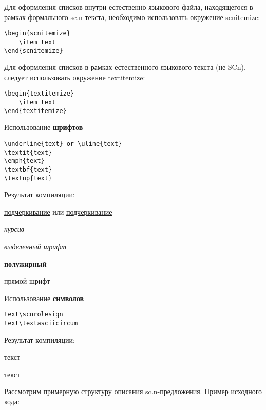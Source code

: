Для оформления списков внутри естественно-языкового файла, находящегося в рамках формального sc.n-текста, необходимо использовать окружение scnitemize:
\begin{lstlisting}              
\begin{scnitemize}
	\item text
\end{scnitemize}
\end{lstlisting}  

Для оформления списков в рамках естественного-языкового текста (не SCn), следует использовать окружение textitemize:
\begin{lstlisting}              
\begin{textitemize}
	\item text
\end{textitemize}
\end{lstlisting}  

Использование \textbf{шрифтов}

\begin{lstlisting}
\underline{text} or \uline{text}
\textit{text}
\emph{text}
\textbf{text}
\textup{text}
\end{lstlisting}

Результат компиляции:

\underline{подчеркивание} или \uline{подчер\-кивание}

\textit{курсив}

\emph{выделенный шрифт}

\textbf{полужирный}

\textup{прямой шрифт}

Использование \textbf{символов}

\begin{lstlisting}
text\scnrolesign
text\textasciicircum
\end{lstlisting}

Результат компиляции:

	текст\scnrolesign
	
	текст\scnsupergroupsign

Рассмотрим примерную структуру описания sc.n-предложения. Пример исходного кода:


